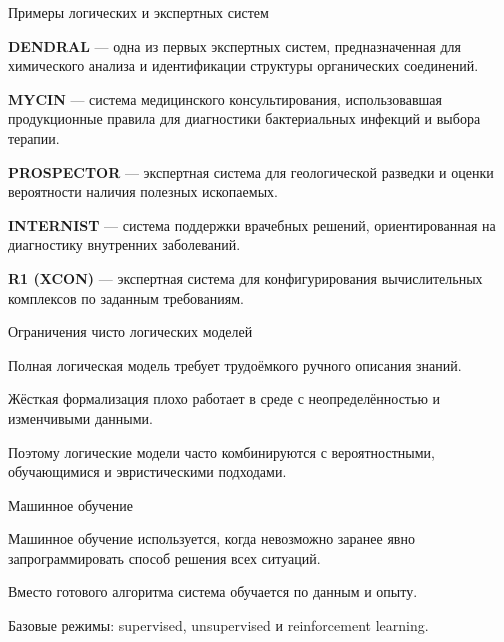 \begin{frame}{Примеры логических и экспертных систем}
	\topline
	\justifying
	
	\vspace{10mm}
	
	\begin{textitemize}
		\item \textbf{DENDRAL} --- одна из первых экспертных систем, предназначенная для химического анализа и идентификации структуры органических соединений.
		\item \textbf{MYCIN} --- система медицинского консультирования, использовавшая продукционные правила для диагностики бактериальных инфекций и выбора терапии.
		\item \textbf{PROSPECTOR} --- экспертная система для геологической разведки и оценки вероятности наличия полезных ископаемых.
		\item \textbf{INTERNIST} --- система поддержки врачебных решений, ориентированная на диагностику внутренних заболеваний.
		\item \textbf{R1 (XCON)} --- экспертная система для конфигурирования вычислительных комплексов по заданным требованиям.
	\end{textitemize}
\end{frame}

\begin{frame}{Ограничения чисто логических моделей}
	\topline
	\justifying
	
	\begin{textitemize}
		\item Полная логическая модель требует трудоёмкого ручного описания знаний.
		\item Жёсткая формализация плохо работает в среде с неопределённостью и изменчивыми данными.
		\item Поэтому логические модели часто комбинируются с вероятностными, обучающимися и эвристическими подходами.
	\end{textitemize}
\end{frame}

\begin{frame}{Машинное обучение}
	\topline
	\justifying
	
	\begin{textitemize}
		\item Машинное обучение используется, когда невозможно заранее явно запрограммировать способ решения всех ситуаций.
		\item Вместо готового алгоритма система обучается по данным и опыту.
		\item Базовые режимы: supervised, unsupervised и reinforcement learning.
	\end{textitemize}
\end{frame}

